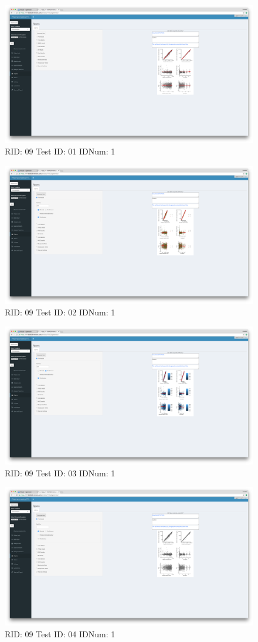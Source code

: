 \begin{figure}[H]
\includegraphics[width=.8\textwidth]{screencaps/09-01-1.png}
\caption{RID: 09 Test ID: 01 IDNum: 1}
\end{figure}
\begin{figure}[H]
\includegraphics[width=.8\textwidth]{screencaps/09-02-1.png}
\caption{RID: 09 Test ID: 02 IDNum: 1}
\end{figure}
\begin{figure}[H]
\includegraphics[width=.8\textwidth]{screencaps/09-03-1.png}
\caption{RID: 09 Test ID: 03 IDNum: 1}
\end{figure}
\begin{figure}[H]
\includegraphics[width=.8\textwidth]{screencaps/09-04-1.png}
\caption{RID: 09 Test ID: 04 IDNum: 1}
\end{figure}
